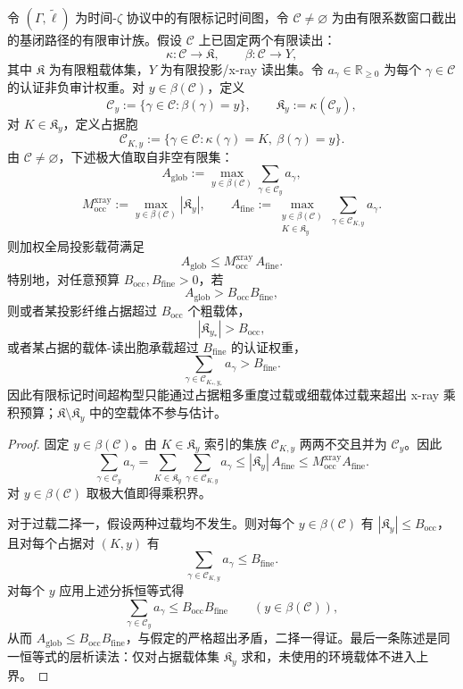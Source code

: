 \begin{proposition}\label{distill:wang_zahl-projection_multiplicity_product-xi-marked-time-window-xray-product}
令 \((\Gamma,\widetilde\ell)\) 为时间-\(\zeta\) 协议中的有限标记时间图，令
\(
\mathcal C\neq\varnothing
\)
为由有限系数窗口截出的基闭路径的有限审计族。假设 \(\mathcal C\) 上已固定两个有限读出：
\[
\kappa:\mathcal C\to\mathfrak K,
\qquad
\beta:\mathcal C\to Y,
\]
其中 \(\mathfrak K\) 为有限粗载体集，\(Y\) 为有限投影/x-ray 读出集。令 \(a_\gamma\in\mathbb R_{\ge0}\) 为每个 \(\gamma\in\mathcal C\) 的认证非负审计权重。对 \(y\in\beta(\mathcal C)\)，定义
\[
\mathcal C_y:=\{\gamma\in\mathcal C:\beta(\gamma)=y\},
\qquad
\mathfrak K_y:=\kappa(\mathcal C_y),
\]
对 \(K\in\mathfrak K_y\)，定义占据胞
\[
\mathcal C_{K,y}:=\{\gamma\in\mathcal C:\kappa(\gamma)=K,\ \beta(\gamma)=y\}.
\]
由 \(\mathcal C\neq\varnothing\)，下述极大值取自非空有限集：
\[
A_{\mathrm{glob}}:=\max_{y\in\beta(\mathcal C)}\sum_{\gamma\in\mathcal C_y}a_\gamma,
\]
\[
M_{\mathrm{occ}}^{\mathrm{xray}}:=\max_{y\in\beta(\mathcal C)}|\mathfrak K_y|,
\qquad
A_{\mathrm{fine}}:=\max_{\substack{y\in\beta(\mathcal C)\\ K\in\mathfrak K_y}}
\sum_{\gamma\in\mathcal C_{K,y}}a_\gamma.
\]
则加权全局投影载荷满足
\[
A_{\mathrm{glob}}\le M_{\mathrm{occ}}^{\mathrm{xray}}\,A_{\mathrm{fine}}.
\]
特别地，对任意预算 \(B_{\mathrm{occ}},B_{\mathrm{fine}}>0\)，若
\[
A_{\mathrm{glob}}>B_{\mathrm{occ}}B_{\mathrm{fine}},
\]
则或者某投影纤维占据超过 \(B_{\mathrm{occ}}\) 个粗载体，
\[
|\mathfrak K_{y_\ast}|>B_{\mathrm{occ}},
\]
或者某占据的载体-读出胞承载超过 \(B_{\mathrm{fine}}\) 的认证权重，
\[
\sum_{\gamma\in\mathcal C_{K_\ast,y_\ast}}a_\gamma>B_{\mathrm{fine}}.
\]
因此有限标记时间超构型只能通过占据粗多重度过载或细载体过载来超出 x-ray 乘积预算；\(\mathfrak K\setminus\mathfrak K_y\) 中的空载体不参与估计。
\end{proposition}
\begin{proof}
固定 \(y\in\beta(\mathcal C)\)。由 \(K\in\mathfrak K_y\) 索引的集族 \(\mathcal C_{K,y}\) 两两不交且并为 \(\mathcal C_y\)。因此
\[
\sum_{\gamma\in\mathcal C_y}a_\gamma
=
\sum_{K\in\mathfrak K_y}\sum_{\gamma\in\mathcal C_{K,y}}a_\gamma
\le
|\mathfrak K_y|\,A_{\mathrm{fine}}
\le
M_{\mathrm{occ}}^{\mathrm{xray}}A_{\mathrm{fine}}.
\]
对 \(y\in\beta(\mathcal C)\) 取极大值即得乘积界。

对于过载二择一，假设两种过载均不发生。则对每个 \(y\in\beta(\mathcal C)\) 有 \(|\mathfrak K_y|\le B_{\mathrm{occ}}\)，且对每个占据对 \((K,y)\) 有
\[
\sum_{\gamma\in\mathcal C_{K,y}}a_\gamma\le B_{\mathrm{fine}}.
\]
对每个 \(y\) 应用上述分拆恒等式得
\[
\sum_{\gamma\in\mathcal C_y}a_\gamma\le B_{\mathrm{occ}}B_{\mathrm{fine}}
\qquad(y\in\beta(\mathcal C)),
\]
从而 \(A_{\mathrm{glob}}\le B_{\mathrm{occ}}B_{\mathrm{fine}}\)，与假定的严格超出矛盾，二择一得证。最后一条陈述是同一恒等式的层析读法：仅对占据载体集 \(\mathfrak K_y\) 求和，未使用的环境载体不进入上界。\qedhere
\end{proof}

